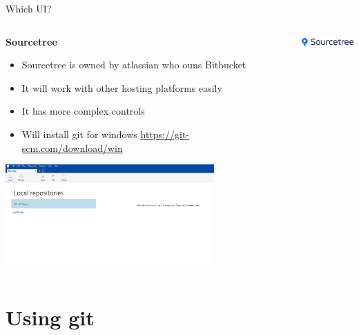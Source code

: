 \documentclass[10pt]{beamer}
\begin{document}
{\begin{frame}[fragile]{Which UI?}
\begin{columns}[T]
\begin{column}{.8\textwidth}
\textbf{Sourcetree\\}
\begin{itemize}
\item Sourcetree is owned by atlassian who ouns Bitbucket
\item It will work with other hosting platforms easily
\item It has more complex controls
\item Will install git for windows \url{https://git-scm.com/download/win}
\end{itemize}
\includegraphics[width=8cm]{Figs/ST/ST_00} 
\end{column}
\begin{column}{.2\textwidth}
\includegraphics[width=2cm]{Figs/git/Sourcetree} \newline \newline \newline 
\end{column}
\end{columns}
\end{frame}


\section{Using git}


}
\end{document}
